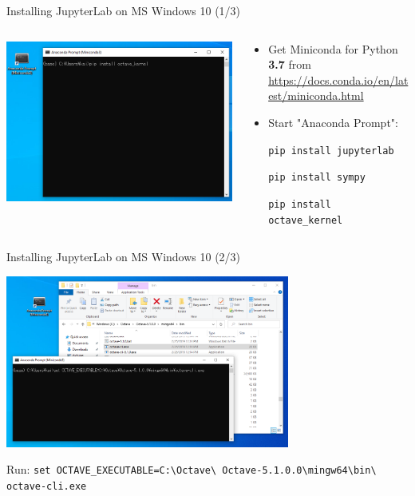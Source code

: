 \begin{frame}{Installing JupyterLab on MS Windows 10 (1/3)}
\begin{columns}
\begin{column}{0.6\textwidth}
\includegraphics[width=\textwidth]{res/ms_windows/win_miniconda.png}
\end{column}
\begin{column}{0.4\textwidth}
\begin{itemize}
\itemsep2em
\item
Get Miniconda for Python \textbf{\color{DarkBlue}3.7} from
{\color{DarkBlue}\url{https://docs.conda.io/en/latest/miniconda.html}}

\item
Start "Anaconda Prompt":

\texttt{pip install jupyterlab}

\texttt{pip install sympy}

\texttt{pip install octave\_kernel}
\end{itemize}
\end{column}
\end{columns}
\end{frame}

\begin{frame}{Installing JupyterLab on MS Windows 10 (2/3)}
\begin{center}
\includegraphics[width=0.7\textwidth]{res/ms_windows/win_miniconda_octave_path.png}

{\small Run:
\texttt{set OCTAVE\_EXECUTABLE=C:\textbackslash Octave\textbackslash
Octave-5.1.0.0\textbackslash mingw64\textbackslash bin\textbackslash
octave-cli.exe}}
\end{center}
\end{frame}

